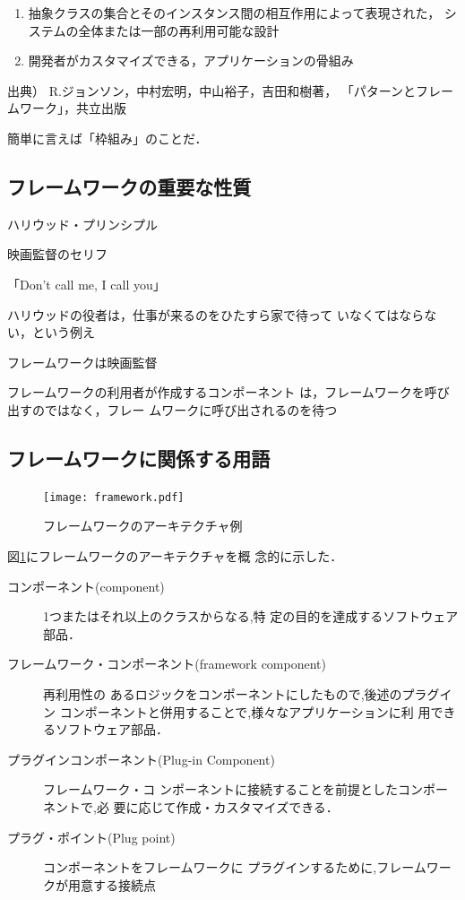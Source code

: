 \documentclass[a4j, twoside]{jsbook}
\begin{document}
\begin{enumerate}
 \item 抽象クラスの集合とそのインスタンス間の相互作用によって表現された，
システムの全体または一部の再利用可能な設計
 \item 開発者がカスタマイズできる，アプリケーションの骨組み
\end{enumerate}

 出典） R.ジョンソン，中村宏明，中山裕子，吉田和樹著，
「パターンとフレームワーク」，共立出版 

簡単に言えば「枠組み」のことだ．

\subsection{フレームワークの重要な性質}
ハリウッド・プリンシプル 

映画監督のセリフ 

「Don’t call me, I call you」 

 ハリウッドの役者は，仕事が来るのをひたすら家で待って
いなくてはならない，という例え 

フレームワークは映画監督 

フレームワークの利用者が作成するコンポーネント
は，フレームワークを呼び出すのではなく，フレー
ムワークに呼び出されるのを待つ 

\subsection{フレームワークに関係する用語}

\begin{figure}
 \begin{center}
  \texttt{[image: framework.pdf]}
  \caption{フレームワークのアーキテクチャ例}\label{fig:framework_architecture}
 \end{center}
\end{figure}

図\ref{fig:framework_architecture}にフレームワークのアーキテクチャを概
念的に示した．

\begin{description}
 \item[コンポーネント(component)] 1つまたはそれ以上のクラスからなる,特
	    定の目的を達成するソフトウェア部品．
 \item[フレームワーク・コンポーネント(framework component)] 再利用性の
	    あるロジックをコンポーネントにしたもので,後述のプラグイン
	    コンポーネントと併用することで,様々なアプリケーションに利
	    用できるソフトウェア部品．
 \item[プラグインコンポーネント(Plug-in Component)] フレームワーク・コ
	    ンポーネントに接続することを前提としたコンポーネントで,必
	    要に応じて作成・カスタマイズできる．
 \item[プラグ・ポイント(Plug point)] コンポーネントをフレームワークに
	    プラグインするために,フレームワークが用意する接続点
\end{description}
\end{document}
